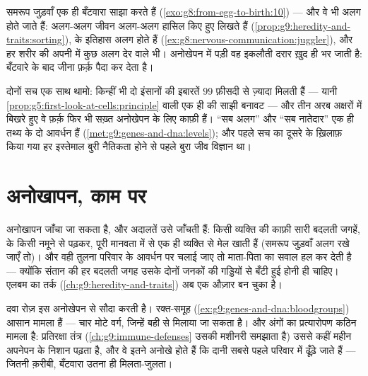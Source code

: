\begin{example}[जुड़वाँ, और अपवाद की हदें]\label{ex:g9:unique-individuals:twins}
समरूप जुड़वाँ एक ही बँटवारा साझा करते हैं
(\cref{exo:g8:from-egg-to-birth:10}) --- और वे भी अलग होते जाते हैं:
अलग-अलग जीवन अलग-अलग हासिल किए हुए  लिखते हैं
(\cref{prop:g9:heredity-and-traits:sorting}),  के
इतिहास अलग होते हैं (\cref{ex:g8:nervous-communication:juggler}), और हर
शरीर की अपनी  में कुछ अलग देर वाले  भी। अनोखेपन में
पड़ी वह इकलौती दरार ख़ुद ही भर जाती है: बँटवारे के बाद जीना फ़र्क़ पैदा
कर देता है।
\end{example}

\begin{remark}[अनोखे, और फिर भी ज़्यादातर एक-से]\label{rem:g9:unique-individuals:alike}
दोनों सच एक साथ थामो: किन्हीं भी दो इंसानों की  इबारतें $99$ फ़ीसदी
से ज़्यादा मिलती हैं --- यानी
\cref{prop:g5:first-look-at-cells:principle} वाली एक ही  की साझी
बनावट --- और तीन अरब अक्षरों में बिखरे हुए वे फ़र्क़ फिर भी सख़्त
अनोखेपन के लिए काफ़ी हैं। ``सब अलग'' और ``सब नातेदार'' एक ही तथ्य के दो
आवर्धन हैं (\cref{met:g9:genes-and-dna:levels}); और पहले सच का दूसरे के
ख़िलाफ़ किया गया हर इस्तेमाल बुरी नैतिकता होने से पहले बुरा जीव विज्ञान
था।
\end{remark}

\section{अनोखापन, काम पर}

\begin{example}\label{ex:g9:unique-individuals:forensics}
अनोखापन जाँचा जा सकता है, और अदालतें उसे जाँचती हैं: किसी व्यक्ति की
काफ़ी सारी बदलती जगहें,  के किसी नमूने से पढ़कर, पूरी मानवता में
से एक ही व्यक्ति से मेल खाती हैं (समरूप जुड़वाँ अलग रखे जाएँ तो)। और वही
तुलना परिवार के आवर्धन पर चलाई जाए तो माता-पिता का सवाल हल कर देती है ---
क्योंकि संतान की हर बदलती जगह उसके दोनों जनकों की गड्डियों से बँटी हुई
होनी ही चाहिए। एलबम का तर्क (\cref{ch:g9:heredity-and-traits}) अब एक
औज़ार बन चुका है।
\end{example}

\begin{example}[रक्त चढ़ाना और अंग-प्रत्यारोपण]\label{ex:g9:unique-individuals:medicine}
दवा रोज़ इस अनोखेपन से सौदा करती है। रक्त-समूह
(\cref{ex:g9:genes-and-dna:bloodgroups}) आसान मामला हैं --- चार मोटे
वर्ग, जिन्हें बही से मिलाया जा सकता है। और अंगों का प्रत्यारोपण कठिन
मामला है: प्रतिरक्षा तंत्र
(\cref{ch:g9:immune-defenses} उसकी मशीनरी समझाता है) उससे कहीं महीन
अपनेपन के निशान पढ़ता है, और वे इतने अनोखे होते हैं कि दानी सबसे पहले
परिवार में ढूँढ़े जाते हैं ---  जितनी क़रीबी, बँटवारा उतना ही
मिलता-जुलता।
\end{example}

